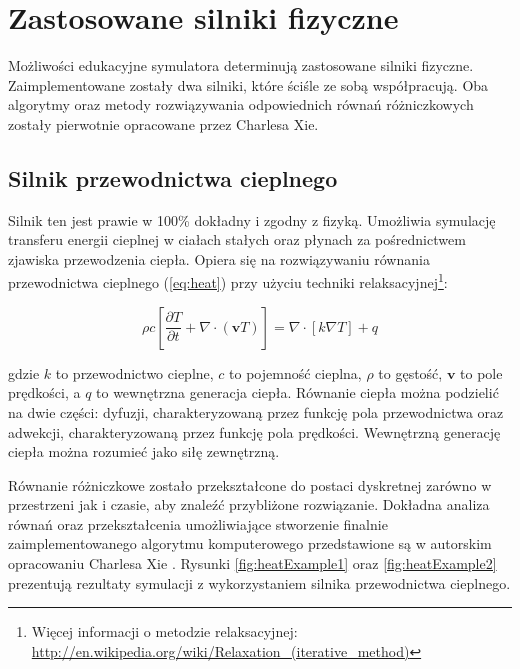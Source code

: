 \section{Zastosowane silniki fizyczne}
\label{sec:silnikiFizyczne}

Możliwości edukacyjne symulatora \en determinują zastosowane silniki fizyczne.
Zaimplementowane zostały dwa silniki, które ściśle ze sobą współpracują. Oba
algorytmy oraz metody rozwiązywania odpowiednich równań różniczkowych  zostały
pierwotnie opracowane przez Charlesa Xie.

\subsection{Silnik przewodnictwa cieplnego}

Silnik ten jest prawie w 100\% dokładny i zgodny z fizyką. Umożliwia symulację
transferu energii cieplnej w ciałach stałych oraz płynach za pośrednictwem
zjawiska przewodzenia ciepła. Opiera się na rozwiązywaniu równania przewodnictwa
cieplnego (\ref{eq:heat}) przy użyciu techniki relaksacyjnej\footnote{ Więcej
informacji o metodzie relaksacyjnej:
\url{http://en.wikipedia.org/wiki/Relaxation_(iterative_method)}}:

\begin{equation}
\label{eq:heat}
\rho c \left[ \frac{\partial T}{\partial t} + \nabla \cdot (\mathbf{v}T) \right] 
= \nabla \cdot [k \nabla T] + q
\end{equation}

gdzie $k$ to przewodnictwo cieplne, $c$ to pojemność cieplna, $\rho$ to gęstość,
$\mathbf{v}$ to pole prędkości, a $q$ to wewnętrzna generacja ciepła. Równanie
ciepła można podzielić na dwie części: dyfuzji, charakteryzowaną przez funkcję
pola przewodnictwa oraz adwekcji, charakteryzowaną przez funkcję pola prędkości.
Wewnętrzną generację ciepła można rozumieć jako siłę zewnętrzną.

Równanie różniczkowe zostało przekształcone do postaci dyskretnej zarówno w
przestrzeni jak i czasie, aby znaleźć przybliżone rozwiązanie. Dokładna analiza
równań oraz przekształcenia umożliwiające stworzenie finalnie zaimplementowanego
algorytmu komputerowego przedstawione są w autorskim opracowaniu Charlesa Xie
\cite{heatEquation}. Rysunki \ref{fig:heatExample1} oraz \ref{fig:heatExample2}
prezentują rezultaty symulacji z wykorzystaniem silnika przewodnictwa cieplnego.

